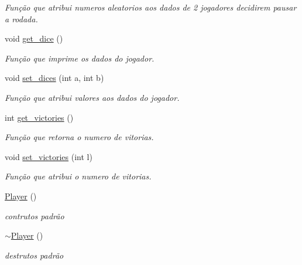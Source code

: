 \begin{DoxyCompactItemize}
\begin{DoxyCompactList}\small\item\em Função que atribui numeros aleatorios aos dados de 2 jogadores decidirem pausar a rodada. \end{DoxyCompactList}\item 
void \hyperlink{classPlayer_a69fb9b7ed4f9b08016ea3e1ceb0cc62a}{get\+\_\+dice} ()\hypertarget{classPlayer_a69fb9b7ed4f9b08016ea3e1ceb0cc62a}{}\label{classPlayer_a69fb9b7ed4f9b08016ea3e1ceb0cc62a}

\begin{DoxyCompactList}\small\item\em Função que imprime os dados do jogador. \end{DoxyCompactList}\item 
void \hyperlink{classPlayer_ae5d0e00cb9d7e7062cb9bd657ce9c788}{set\+\_\+dices} (int a, int b)
\begin{DoxyCompactList}\small\item\em Função que atribui valores aos dados do jogador. \end{DoxyCompactList}\item 
int \hyperlink{classPlayer_a60eeceaa5e8f26b1989e148ec6466239}{get\+\_\+victories} ()
\begin{DoxyCompactList}\small\item\em Função que retorna o numero de vitorias. \end{DoxyCompactList}\item 
void \hyperlink{classPlayer_a066e272c03740841656569f1ecd2b45d}{set\+\_\+victories} (int l)\hypertarget{classPlayer_a066e272c03740841656569f1ecd2b45d}{}\label{classPlayer_a066e272c03740841656569f1ecd2b45d}

\begin{DoxyCompactList}\small\item\em Função que atribui o numero de vitorias. \end{DoxyCompactList}\item 
\hyperlink{classPlayer_affe0cc3cb714f6deb4e62f0c0d3f1fd8}{Player} ()\hypertarget{classPlayer_affe0cc3cb714f6deb4e62f0c0d3f1fd8}{}\label{classPlayer_affe0cc3cb714f6deb4e62f0c0d3f1fd8}

\begin{DoxyCompactList}\small\item\em contrutos padrão \end{DoxyCompactList}\item 
\hyperlink{classPlayer_a749d2c00e1fe0f5c2746f7505a58c062}{$\sim$\+Player} ()\hypertarget{classPlayer_a749d2c00e1fe0f5c2746f7505a58c062}{}\label{classPlayer_a749d2c00e1fe0f5c2746f7505a58c062}

\begin{DoxyCompactList}\small\item\em destrutos padrão \end{DoxyCompactList}\end{DoxyCompactItemize}
